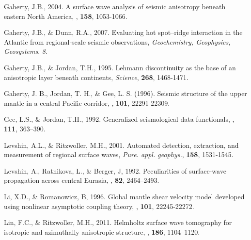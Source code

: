 \documentclass{gji}
\begin{document}
\begin{thebibliography}{}
	   Gaherty, J.B., 2004. A surface wave analysis of seismic anisotropy beneath eastern North America, \textbf{\gji}, \textbf{158}, 1053-1066.

	   Gaherty, J.B., \& Dunn, R.A., 2007. Evaluating hot spot–ridge interaction in the Atlantic from regional‐scale seismic observations, \textit{Geochemistry, Geophysics, Geosystems}, \textit{8}.

	   Gaherty, J.B., \& Jordan, T.H., 1995. Lehmann discontinuity as the base of an anisotropic layer beneath continents, \textit{Science}, \textbf{268}, 1468-1471.

	   Gaherty, J. B., Jordan, T. H., \& Gee, L. S. (1996). Seismic structure of the upper mantle in a central Pacific corridor, \textit{\jgr}, \textbf{101}, 22291-22309.

	   Gee, L.S., \& Jordan, T.H., 1992. Generalized seismological data functionals, \textit{\gji}, \textbf{111}, 363–390.


	   Levshin, A.L., \& Ritzwoller, M.H., 2001. Automated detection, extraction, and measurement of regional surface waves, \textit{Pure. appl. geophys.}, \textbf{158}, 1531-1545.

	   Levshin, A., Ratnikova, L., \& Berger, J, 1992. Peculiarities of surface-wave propagation across central Eurasia, \textit{\bssa}, \textbf{82}, 2464–2493.

	   Li, X.D., \& Romanowicz, B, 1996. Global mantle shear velocity model developed using nonlinear asymptotic coupling theory, \textit{\jgr}, \textbf{101}, 22245-22272.

	   Lin, F.C., \& Ritzwoller, M.H., 2011. Helmholtz surface wave tomography for isotropic and azimuthally anisotropic structure, \textit{\gji}, \textbf{186}, 1104–1120.


\end{thebibliography}
\end{document}
